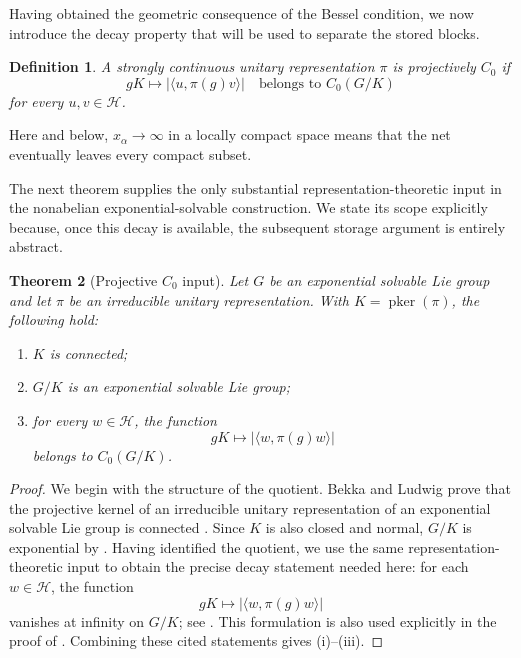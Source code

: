 \documentclass[10pt,a4paper]{amsart}
\numberwithin{equation}{section}
\newtheorem{theorem}{Theorem}[section]
\newtheorem{definition}[theorem]{Definition}
\newcommand{\cH}{\mathcal H}
\newcommand{\pker}{\operatorname{pker}}
\begin{document}
Having obtained the geometric consequence of the Bessel condition, we now
introduce the decay property that will be used to separate the stored blocks.

\begin{definition}\label{def:projective-c0}
A strongly continuous unitary representation $\pi$ is
\emph{projectively $C_0$} if
\begin{equation}\label{eq:projective-c0-definition}
 gK\longmapsto |\langle u,\pi(g)v\rangle|
 \quad\text{belongs to }C_0(G/K)
\end{equation}
for every $u,v\in\cH$.
\end{definition}

Here and below, $x_\alpha\to\infty$ in a locally compact space means that
the net eventually leaves every compact subset.

The next theorem supplies the only substantial representation-theoretic
input in the nonabelian exponential-solvable construction.  We state its
scope explicitly because, once this decay is available, the subsequent
storage argument is entirely abstract.

\begin{theorem}[Projective $C_0$ input]
\label{thm:projective-c0-input}
Let $G$ be an exponential solvable Lie group and let $\pi$ be an irreducible unitary
representation.  With $K=\pker(\pi)$, the following hold:
\begin{enumerate}[label=\textnormal{(\roman*)}]
\item $K$ is connected;
\item $G/K$ is an exponential solvable Lie group;
\item for every $w\in\cH$, the function
\[
 gK\longmapsto |\langle w,\pi(g)w\rangle|
\]
belongs to $C_0(G/K)$.
\end{enumerate}
\end{theorem}

\begin{proof}
We begin with the structure of the quotient.  Bekka and Ludwig prove that the
projective kernel of an irreducible unitary
representation of an exponential solvable Lie group is connected
\cite[Theorem~2.1]{BekkaLudwig1990}.  Since $K$ is also closed and normal,
$G/K$ is exponential by \cite[Corollary~1.8.5]{ArnalCurrey2020}.  Having
identified the quotient, we use the same representation-theoretic input to
obtain the precise decay statement needed
here: for each $w\in\cH$, the function
\[
 gK\longmapsto |\langle w,\pi(g)w\rangle|
\]
vanishes at infinity on $G/K$; see
\cite[Lemma~2.2.1, p.~520]{BekkaLudwig1990}.  This formulation is also used
explicitly in the proof of \cite[Proposition~2.2]{BeltitaVanVelthoven2024}.
Combining these cited statements gives (i)--(iii).
\end{proof}
\end{document}
